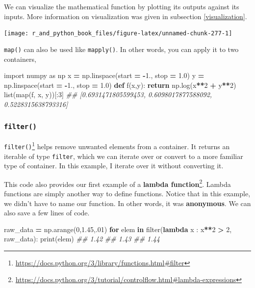 \documentclass[
  12pt,
  krantz2]{krantz}
\makeatletter
\newenvironment{Shaded}{\begin{snugshade}}{\end{snugshade}}
\newcommand{\BuiltInTok}[1]{#1}
\newcommand{\CommentTok}[1]{\textcolor[rgb]{0.37,0.37,0.37}{\textit{#1}}}
\newcommand{\ControlFlowTok}[1]{\textcolor[rgb]{0.27,0.27,0.27}{\textbf{#1}}}
\newcommand{\DecValTok}[1]{\textcolor[rgb]{0.06,0.06,0.06}{#1}}
\newcommand{\FloatTok}[1]{\textcolor[rgb]{0.06,0.06,0.06}{#1}}
\newcommand{\ImportTok}[1]{#1}
\newcommand{\KeywordTok}[1]{\textcolor[rgb]{0.27,0.27,0.27}{\textbf{#1}}}
\newcommand{\NormalTok}[1]{#1}
\newcommand{\OperatorTok}[1]{\textcolor[rgb]{0.43,0.43,0.43}{\textbf{#1}}}
\renewcommand{\href}[2]{#2\footnote{\url{#1}}}
\newenvironment{kframe}{%
\medskip{}
\setlength{\fboxsep}{.8em}
 \def\at@end@of@kframe{}%
 \ifinner\ifhmode%
  \def\at@end@of@kframe{\end{minipage}}%
  \begin{minipage}{\columnwidth}%
 \fi\fi%
 \def\FrameCommand##1{\hskip\@totalleftmargin \hskip-\fboxsep
 \colorbox{shadecolor}{##1}\hskip-\fboxsep
     \hskip-\linewidth \hskip-\@totalleftmargin \hskip\columnwidth}%
 \MakeFramed {\advance\hsize-\width
   \@totalleftmargin\z@ \linewidth\hsize
   \@setminipage}}%
 {\par\unskip\endMakeFramed%
 \at@end@of@kframe}
\renewenvironment{Shaded}{\begin{kframe}}{\end{kframe}}
\makeatother
\begin{document}
We can visualize the mathematical function by plotting its outputs against its inputs. More information on visualization was given in subsection \ref{visualization}.

\texttt{[image: r\_and\_python\_book\_files/figure-latex/unnamed-chunk-277-1]}

\texttt{map()} can also be used like \texttt{mapply()}. In other words, you can apply it to two containers,

\begin{Shaded}
\begin{Highlighting}[]
\ImportTok{import}\NormalTok{ numpy }\ImportTok{as}\NormalTok{ np}
\NormalTok{x }\OperatorTok{=}\NormalTok{ np.linspace(start }\OperatorTok{=} \OperatorTok{{-}}\FloatTok{1.}\NormalTok{, stop }\OperatorTok{=} \FloatTok{1.0}\NormalTok{)}
\NormalTok{y }\OperatorTok{=}\NormalTok{ np.linspace(start }\OperatorTok{=} \OperatorTok{{-}}\FloatTok{1.}\NormalTok{, stop }\OperatorTok{=} \FloatTok{1.0}\NormalTok{)}
\KeywordTok{def}\NormalTok{ f(x,y):}
    \ControlFlowTok{return}\NormalTok{ np.log(x}\OperatorTok{**}\DecValTok{2} \OperatorTok{+}\NormalTok{ y}\OperatorTok{**}\DecValTok{2}\NormalTok{)}
\BuiltInTok{list}\NormalTok{(}\BuiltInTok{map}\NormalTok{(f, x, y))[:}\DecValTok{3}\NormalTok{]}
\CommentTok{\#\# [0.6931471805599453, 0.6098017877588092, 0.5228315638793316]}
\end{Highlighting}
\end{Shaded}

\hypertarget{filter}{%
\subsubsection{\texorpdfstring{\texttt{filter()}}{filter()}}\label{filter}}

\href{https://docs.python.org/3/library/functions.html\#filter}{\texttt{filter()}} helps remove unwanted elements from a container. It returns an iterable of type \texttt{filter}, which we can iterate over or convert to a more familiar type of container. In this example, I iterate over it without converting it.

This code also provides our first example of a \href{https://docs.python.org/3/tutorial/controlflow.html\#lambda-expressions}{\textbf{lambda function}}. Lambda functions are simply another way to define functions. Notice that in this example, we didn't have to name our function. In other words, it was \textbf{anonymous}. We can also save a few lines of code.

\begin{Shaded}
\begin{Highlighting}[]
\NormalTok{raw\_data }\OperatorTok{=}\NormalTok{ np.arange(}\DecValTok{0}\NormalTok{,}\FloatTok{1.45}\NormalTok{,}\FloatTok{.01}\NormalTok{)}
\ControlFlowTok{for}\NormalTok{ elem }\KeywordTok{in} \BuiltInTok{filter}\NormalTok{(}\KeywordTok{lambda}\NormalTok{ x : x}\OperatorTok{**}\DecValTok{2} \OperatorTok{\textgreater{}} \DecValTok{2}\NormalTok{, raw\_data):}
    \BuiltInTok{print}\NormalTok{(elem)}
\CommentTok{\#\# 1.42}
\CommentTok{\#\# 1.43}
\CommentTok{\#\# 1.44}
\end{Highlighting}
\end{Shaded}
\end{document}
